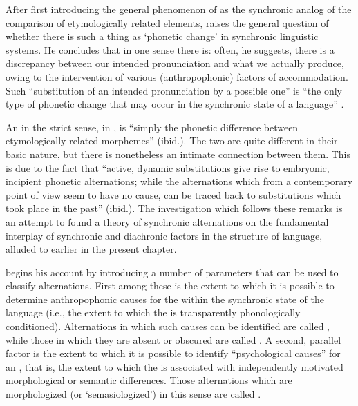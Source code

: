After first introducing the general phenomenon of  as the
syn\-chronic analog of the comparison of etymologically related
elements, {\Baudouin} raises the general question of whether there is
such a thing as `phonetic change' in synchronic linguistic systems. He
concludes that in one sense there is: often, he suggests, there is a
discrepancy between our intended pronunciation and what we actually
produce, owing to the intervention of various (anthropophonic) factors
of accommodation. Such ``substitution of an intended pronunciation by a
possible one'' is ``the only type of phonetic change that may occur in
the synchronic state of a language'' \citep[159f.]{baudouin95:attempt}.

An  in the strict sense, in , is ``simply the
phonetic difference between etymologically related morphemes''
(ibid.). The two are quite different in their basic nature, but there
is nonetheless an intimate connection between them. This is due to the
fact that ``active, dynamic substitutions give rise to embryonic,
incipient phonetic alternations; while the alternations which from a
contemporary point of view seem to have no cause, can be traced back
to substitutions which took place in the past'' (ibid.). The
investigation which follows these remarks is an attempt to found a
theory of synchronic alternations on the fundamental interplay of
synchronic and diachronic factors in the structure of language,
alluded to earlier in the present chapter.

{\Baudouin} begins his account by introducing a number of parameters that
can be used to classify alternations. First among these is the extent
to which it is possible to determine anthropophonic causes for the
 within the synchronic state of the language (i.e., the extent
to which the  is transparently phonologically
conditioned). Alternations in which such causes can be identified are
called \emph{}, while those in which they are absent or obscured
are called \emph{}. A second, parallel factor is the extent to
which it is possible to identify ``psychological causes'' for an
, that is, the extent to which the  is
associated with independently motivated morphological or semantic
differences. Those alternations which are morphologized (or
`semasiologized') in this sense are called \emph{}.

